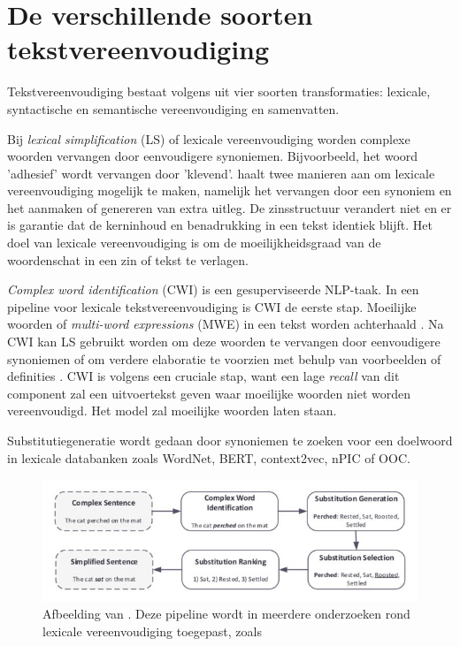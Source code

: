 \section{De verschillende soorten tekstvereenvoudiging}

Tekstvereenvoudiging bestaat volgens \textcite{Siddharthan2014} uit vier soorten transformaties: lexicale, syntactische en semantische vereenvoudiging en samenvatten.

\medspace

Bij \textit{lexical simplification} (LS) of lexicale vereenvoudiging worden complexe woorden vervangen door eenvoudigere synoniemen. Bijvoorbeeld, het woord 'adhesief' wordt vervangen door 'klevend'. \textcite{Kandula2010} haalt twee manieren aan om lexicale vereenvoudiging mogelijk te maken, namelijk het vervangen door een synoniem en het aanmaken of genereren van extra uitleg. De zinsstructuur verandert niet en er is garantie dat de kerninhoud en benadrukking in een tekst identiek blijft. Het doel van lexicale vereenvoudiging is om de moeilijkheidsgraad van de woordenschat in een zin of tekst te verlagen. 

\medspace

\textit{Complex word identification} (CWI) is een gesuperviseerde NLP-taak. In een pipeline voor lexicale tekstvereenvoudiging is CWI de eerste stap. Moeilijke woorden of \textit{multi-word expressions} (MWE) in een tekst worden achterhaald  \autocite{Shardlow2013, Gooding2019}. Na CWI kan LS gebruikt worden om deze woorden te vervangen door eenvoudigere synoniemen of om verdere elaboratie te voorzien met behulp van voorbeelden of definities \autocite{Zeng2005, Kandula2010}. CWI is volgens \textcite{Shardlow2013} een cruciale stap, want een lage \textit{recall} van dit component zal een uitvoertekst geven waar moeilijke woorden niet worden vereenvoudigd. Het model zal moeilijke woorden laten staan.

\medspace

Substitutiegeneratie wordt gedaan door synoniemen te zoeken voor een doelwoord in lexicale databanken zoals WordNet, BERT, context2vec, nPIC of OOC. 
\begin{figure}[H]
	\includegraphics{img/lexical-simplification-pipeline.png}
	\caption{Afbeelding van \textcite{Althunayyan2021}. Deze pipeline wordt in meerdere onderzoeken rond lexicale vereenvoudiging toegepast, zoals \textcite{Paetzold2016, Bingel2018, Bulte2018}}
\end{figure}


